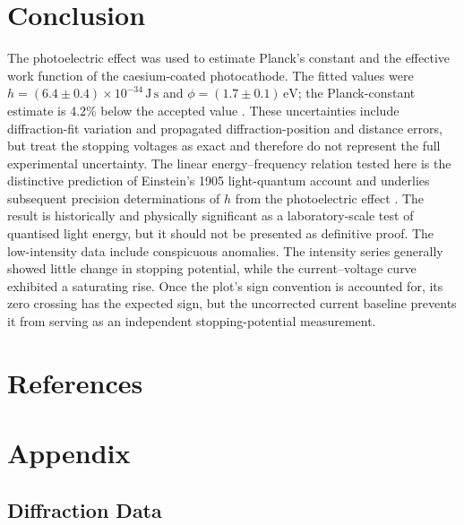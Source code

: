 \documentclass[12pt,a4paper]{article}
\begin{document}
\section{Conclusion}

The photoelectric effect was used to estimate Planck's constant and the effective work function of the caesium-coated photocathode. The fitted values were \(h=(6.4\pm0.4)\times10^{-34}\,\mathrm{J\,s}\) and \(\phi=(1.7\pm0.1)\,\mathrm{eV}\); the Planck-constant estimate is 4.2\% below the accepted value \cite{nistconstants}. These uncertainties include diffraction-fit variation and propagated diffraction-position and distance errors, but treat the stopping voltages as exact and therefore do not represent the full experimental uncertainty. The linear energy--frequency relation tested here is the distinctive prediction of Einstein's 1905 light-quantum account and underlies subsequent precision determinations of \(h\) from the photoelectric effect \cite{einstein1905,millikan1916}. The result is historically and physically significant as a laboratory-scale test of quantised light energy, but it should not be presented as definitive proof. The low-intensity data include conspicuous anomalies. The intensity series generally showed little change in stopping potential, while the current--voltage curve exhibited a saturating rise. Once the plot's sign convention is accounted for, its zero crossing has the expected sign, but the uncorrected current baseline prevents it from serving as an independent stopping-potential measurement.

\newpage

\section{References}
\printbibliography[heading=none]

\newpage

\appendix
\section{Appendix}
\subsection{Diffraction Data}
\end{document}
